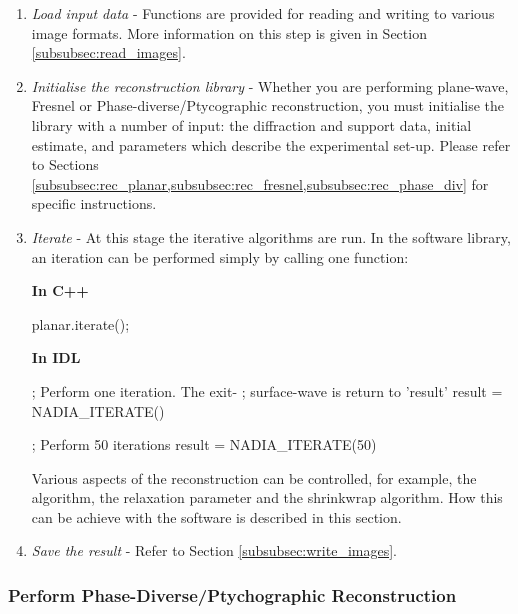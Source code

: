 \documentclass[]{nadia}
\begin{document}
\begin{enumerate}

\item {\it Load input data} - Functions are provided for reading and
  writing to various image formats. More information on this step is
  given in Section \ref{subsubsec:read_images}. 
  
\item {\it Initialise the reconstruction library} - Whether you are
  performing plane-wave, Fresnel or Phase-diverse/Ptycographic
  reconstruction, you must initialise the library with a number of
  input: the diffraction and support data, initial estimate, and
  parameters which describe the experimental set-up. Please refer to
  Sections \ref{subsubsec:rec_planar,subsubsec:rec_fresnel,subsubsec:rec_phase_div}
  for specific instructions.
      
\item {\it Iterate} - At this stage the iterative algorithms are run. In the software library, an iteration can be
  performed simply by calling one function:
      
      {\bf In C++}
      \begin{myverbatim}[language=C++]
        planar.iterate();
      \end{myverbatim}
      
      {\bf In IDL}
      \begin{myverbatim}[language=IDL]
        ; Perform one iteration. The exit-
        ; surface-wave is return to 'result'  
        result = NADIA_ITERATE()
        
        ; Perform 50 iterations
        result = NADIA_ITERATE(50)
      \end{myverbatim}

      Various aspects of the reconstruction can be controlled, for
      example, the algorithm, the relaxation parameter and the
      shrinkwrap algorithm. How this can be achieve with the software
      is described in this section. 


    \item {\it Save the result} - Refer to Section \ref{subsubsec:write_images}.

\end{enumerate}




\subsubsection{Perform Phase-Diverse/Ptychographic Reconstruction}
\label{subsubsec:rec_phase_div}
\end{document}
